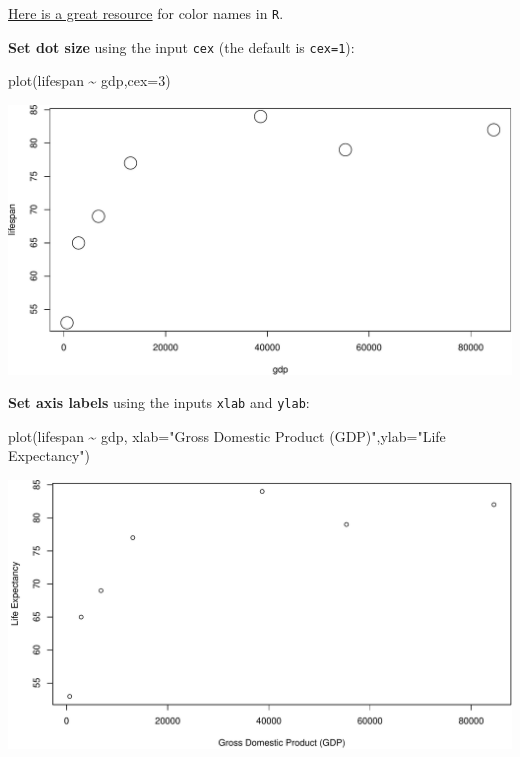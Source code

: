 \documentclass[
]{book}
\newenvironment{Shaded}{\begin{snugshade}}{\end{snugshade}}
\newcommand{\AttributeTok}[1]{\textcolor[rgb]{0.77,0.63,0.00}{#1}}
\newcommand{\DecValTok}[1]{\textcolor[rgb]{0.00,0.00,0.81}{#1}}
\newcommand{\FunctionTok}[1]{\textcolor[rgb]{0.00,0.00,0.00}{#1}}
\newcommand{\NormalTok}[1]{#1}
\newcommand{\SpecialCharTok}[1]{\textcolor[rgb]{0.00,0.00,0.00}{#1}}
\newcommand{\StringTok}[1]{\textcolor[rgb]{0.31,0.60,0.02}{#1}}
\begin{document}
\href{http://www.stat.columbia.edu/~tzheng/files/Rcolor.pdf?utm_source=twitterfeed\&utm_medium=twitter}{Here is a great resource} for color names in \texttt{R}.

\textbf{Set dot size} using the input \texttt{cex} (the default is \texttt{cex=1}):

\begin{Shaded}
\begin{Highlighting}[]
\FunctionTok{plot}\NormalTok{(lifespan }\SpecialCharTok{\textasciitilde{}}\NormalTok{ gdp,}\AttributeTok{cex=}\DecValTok{3}\NormalTok{)}
\end{Highlighting}
\end{Shaded}

\includegraphics{figures/unnamed-chunk-105-1.pdf}

\textbf{Set axis labels} using the inputs \texttt{xlab} and \texttt{ylab}:

\begin{Shaded}
\begin{Highlighting}[]
\FunctionTok{plot}\NormalTok{(lifespan }\SpecialCharTok{\textasciitilde{}}\NormalTok{ gdp, }\AttributeTok{xlab=}\StringTok{"Gross Domestic Product (GDP)"}\NormalTok{,}\AttributeTok{ylab=}\StringTok{"Life Expectancy"}\NormalTok{)}
\end{Highlighting}
\end{Shaded}

\includegraphics{figures/unnamed-chunk-106-1.pdf}
\end{document}
